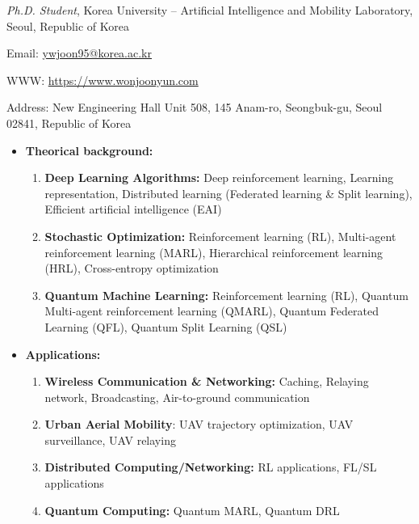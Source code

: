 \documentclass[10pt,letterpaper]{article}
\begin{document}
\sloppy

\nobreakvspace{0.3em}


\noindent \textit{Ph.D. Student}, Korea University -- Artificial Intelligence and Mobility Laboratory, Seoul, Republic of Korea


\noindent \sbull Email: \noindent\href{mailto:ywjoon95@korea.ac.kr}{ywjoon95\mbox{}@\mbox{}korea.ac.kr}

\noindent\sbull WWW: \url{https://www.wonjoonyun.com}

\noindent\sbull Address: New Engineering Hall Unit 508, 145 Anam-ro, Seongbuk-gu, Seoul 02841, Republic of Korea

\spacedhrule{0.5em}{-0.7em}

\begin{itemize}\itemsep=-0.8mm
    \item\textbf{Theorical background:} \begin{enumerate}
        \item \textbf{Deep Learning Algorithms:} Deep reinforcement learning, Learning representation, Distributed learning (Federated learning \& Split learning), Efficient artificial intelligence (EAI)
        \item \textbf{Stochastic Optimization:} Reinforcement learning (RL), Multi-agent reinforcement learning (MARL), Hierarchical reinforcement learning (HRL), Cross-entropy optimization
        \item \textbf{Quantum Machine Learning:} Reinforcement learning (RL), Quantum Multi-agent reinforcement learning (QMARL), Quantum Federated Learning (QFL), Quantum Split Learning (QSL)
    \end{enumerate}
\item \textbf{Applications:} \begin{enumerate}
    \item \textbf{Wireless Communication \& Networking:} Caching, Relaying network, Broadcasting, Air-to-ground communication
    \item \textbf{Urban Aerial Mobility}: UAV trajectory optimization, UAV surveillance, UAV relaying
    \item \textbf{Distributed Computing/Networking:} RL applications, FL/SL applications
    \item \textbf{Quantum Computing:} Quantum MARL, Quantum DRL
\end{enumerate}
\end{itemize}
\end{document}
